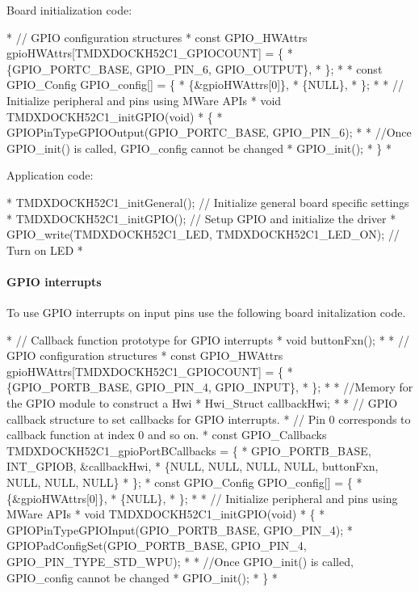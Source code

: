 Board initialization code\-: 
\begin{DoxyCode}
*  \textcolor{comment}{// GPIO configuration structures}
*  \textcolor{keyword}{const} GPIO_HWAttrs gpioHWAttrs[TMDXDOCKH52C1\_GPIOCOUNT] = \{
*      \{GPIO\_PORTC\_BASE, GPIO\_PIN\_6, GPIO_OUTPUT\},
*  \};
*
*  \textcolor{keyword}{const} GPIO_Config GPIO\_config[] = \{
*     \{&gpioHWAttrs[0]\},
*     \{NULL\},
* \};
*
*  \textcolor{comment}{// Initialize peripheral and pins using MWare APIs}
*  \textcolor{keywordtype}{void} TMDXDOCKH52C1\_initGPIO(\textcolor{keywordtype}{void})
*  \{
*      GPIOPinTypeGPIOOutput(GPIO\_PORTC\_BASE, GPIO\_PIN\_6);
*
*      \textcolor{comment}{//Once GPIO\_init() is called, GPIO\_config cannot be changed}
*      GPIO_init();
*  \}
*  
\end{DoxyCode}


Application code\-: 
\begin{DoxyCode}
*  TMDXDOCKH52C1\_initGeneral(); \textcolor{comment}{// Initialize general board specific settings}
*  TMDXDOCKH52C1\_initGPIO(); \textcolor{comment}{// Setup GPIO and initialize the driver}
*  GPIO_write(TMDXDOCKH52C1\_LED, TMDXDOCKH52C1\_LED\_ON); \textcolor{comment}{// Turn on LED}
*  
\end{DoxyCode}


\paragraph*{G\-P\-I\-O interrupts}

To use G\-P\-I\-O interrupts on input pins use the following board initalization code.


\begin{DoxyCode}
*  \textcolor{comment}{// Callback function prototype for GPIO interrupts}
*  \textcolor{keywordtype}{void} buttonFxn();
*
*  \textcolor{comment}{// GPIO configuration structures}
*  \textcolor{keyword}{const} GPIO_HWAttrs gpioHWAttrs[TMDXDOCKH52C1\_GPIOCOUNT] = \{
*      \{GPIO\_PORTB\_BASE, GPIO\_PIN\_4, GPIO_INPUT\},
*  \};
*
*  \textcolor{comment}{//Memory for the GPIO module to construct a Hwi}
*  Hwi\_Struct callbackHwi;
*
*  \textcolor{comment}{// GPIO callback structure to set callbacks for GPIO interrupts.}
*  \textcolor{comment}{// Pin 0 corresponds to callback function at index 0 and so on.}
*  \textcolor{keyword}{const} GPIO_Callbacks TMDXDOCKH52C1\_gpioPortBCallbacks = \{
*      GPIO\_PORTB\_BASE, INT\_GPIOB, &callbackHwi,
*      \{NULL, NULL, NULL, NULL, buttonFxn, NULL, NULL, NULL\}
*  \};
*  \textcolor{keyword}{const} GPIO_Config GPIO\_config[] = \{
*      \{&gpioHWAttrs[0]\},
*      \{NULL\},
*  \};
*
*  \textcolor{comment}{// Initialize peripheral and pins using MWare APIs}
*  \textcolor{keywordtype}{void} TMDXDOCKH52C1\_initGPIO(\textcolor{keywordtype}{void})
*  \{
*      GPIOPinTypeGPIOInput(GPIO\_PORTB\_BASE, GPIO\_PIN\_4);
*      GPIOPadConfigSet(GPIO\_PORTB\_BASE, GPIO\_PIN\_4, GPIO\_PIN\_TYPE\_STD\_WPU);
*
*      \textcolor{comment}{//Once GPIO\_init() is called, GPIO\_config cannot be changed}
*      GPIO_init();
*  \}
*  
\end{DoxyCode}


